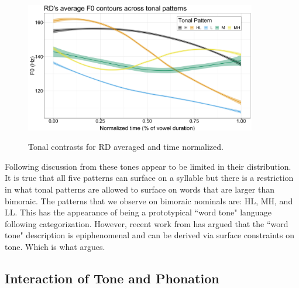 \documentclass[12pt, letterpaper]{article}
\begin{document}
\begin{figure}[!ht]
	\centering
	\includegraphics[width=0.9\textwidth]{../RDTonePlot.png}
	\label{fig:RDTonePlot}
	\caption{Tonal contrasts for RD averaged and time normalized.}
\end{figure}

Following discussion from \citet{brinkerhoffTonalPatternsTheir2022} these tones appear to be limited in their distribution. It is true that all five patterns can surface on a syllable but there is a restriction in what tonal patterns are allowed to surface on words that are larger than bimoraic. The patterns that we observe on bimoraic nominals are: HL, MH, and LL. This has the appearance of being a prototypical ``word tone" language following  categorization. However, recent work from \citet{shihAutosegmentalAimsSurfaceOptimizing2019,mcphersonWordToneEpiphenomenalInpress} has argued that the ``word tone" description is epiphenomenal and can be derived via surface constraints on tone. Which is what \citet{brinkerhoffTonalPatternsTheir2022} argues. 

\subsection{Interaction of Tone and Phonation} \label{sec:Interaction}
\end{document}
